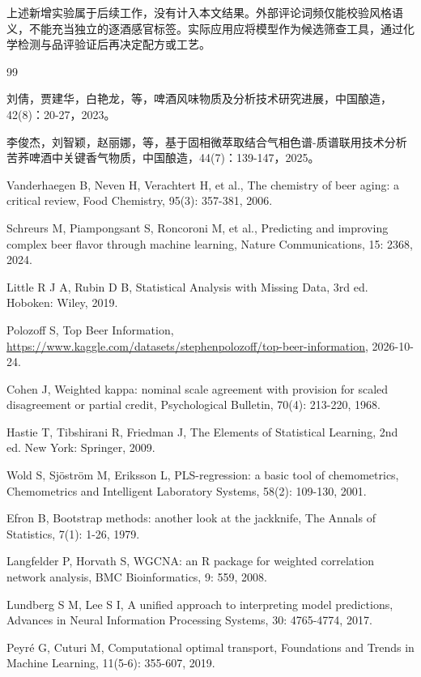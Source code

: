 \documentclass[UTF8,a4paper,zihao=-4]{ctexart}
\numberwithin{figure}{section}
\numberwithin{table}{section}
\numberwithin{equation}{section}
\begin{document}
上述新增实验属于后续工作，没有计入本文结果。外部评论词频仅能校验风格语义，不能充当独立的逐酒感官标签。实际应用应将模型作为候选筛查工具，通过化学检测与品评验证后再决定配方或工艺。

\begin{thebibliography}{99}
\raggedright
{}

刘倩，贾建华，白艳龙，等，啤酒风味物质及分析技术研究进展，中国酿造，42(8)：20-27，2023。

李俊杰，刘智颖，赵丽娜，等，基于固相微萃取结合气相色谱-质谱联用技术分析苦荞啤酒中关键香气物质，中国酿造，44(7)：139-147，2025。

Vanderhaegen B, Neven H, Verachtert H, et al., The chemistry of beer aging: a critical review, Food Chemistry, 95(3): 357-381, 2006.

Schreurs M, Piampongsant S, Roncoroni M, et al., Predicting and improving complex beer flavor through machine learning, Nature Communications, 15: 2368, 2024.

Little R J A, Rubin D B, Statistical Analysis with Missing Data, 3rd ed. Hoboken: Wiley, 2019.

Polozoff S, Top Beer Information, \url{https://www.kaggle.com/datasets/stephenpolozoff/top-beer-information}, 2026-10-24.

Cohen J, Weighted kappa: nominal scale agreement with provision for scaled disagreement or partial credit, Psychological Bulletin, 70(4): 213-220, 1968.

Hastie T, Tibshirani R, Friedman J, The Elements of Statistical Learning, 2nd ed. New York: Springer, 2009.

Wold S, Sj\"ostr\"om M, Eriksson L, PLS-regression: a basic tool of chemometrics, Chemometrics and Intelligent Laboratory Systems, 58(2): 109-130, 2001.

Efron B, Bootstrap methods: another look at the jackknife, The Annals of Statistics, 7(1): 1-26, 1979.

Langfelder P, Horvath S, WGCNA: an R package for weighted correlation network analysis, BMC Bioinformatics, 9: 559, 2008.

Lundberg S M, Lee S I, A unified approach to interpreting model predictions, Advances in Neural Information Processing Systems, 30: 4765-4774, 2017.

Peyr\'e G, Cuturi M, Computational optimal transport, Foundations and Trends in Machine Learning, 11(5-6): 355-607, 2019.

\end{thebibliography}
\end{document}
